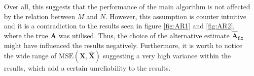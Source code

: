 \noindent 
{}
Over all, this suggests that the performance of the main algorithm is not affected by the relation between $M$ and $N$.
However, this assumption is counter intuitive and it is a contradiction to the results seen in figure \ref{fig:AR1} and \ref{fig:AR2}, where the true $\mathbf{A}$ was utilised. 
Thus, the choice of the alternative estimate $\hat{\mathbf{A}}_{\text{fix}}$ might have influenced the results negatively. 
Furthermore, it is worth to notice the wide range of $\text{MSE}(\mathbf{X}, \hat{\mathbf{X}})$ suggesting a very high variance within the results, which add a certain unreliability to the results.    